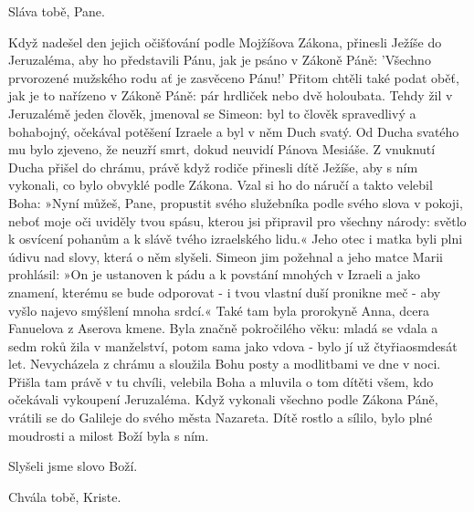 \rubricatum{\Rbardot{}} Sláva tobě, Pane.

Když nadešel den jejich očišťování podle Mojžíšova Zákona, přinesli Ježíše
do Jeruzaléma, aby ho představili Pánu, jak je psáno v Zákoně Páně: 'Všechno
prvorozené mužského rodu ať je zasvěceno Pánu!' Přitom chtěli také podat
oběť, jak je to nařízeno v Zákoně Páně: pár hrdliček nebo dvě holoubata. 
Tehdy žil v Jeruzalémě jeden člověk, jmenoval se Simeon: byl to člověk
spravedlivý a bohabojný, očekával potěšení Izraele a byl v něm Duch svatý. 
Od Ducha svatého mu bylo zjeveno, že neuzří smrt, dokud neuvidí Pánova
Mesiáše.  Z vnuknutí Ducha přišel do chrámu, právě když rodiče přinesli dítě
Ježíše, aby s ním vykonali, co bylo obvyklé podle Zákona.  Vzal si ho do
náručí a takto velebil Boha: »Nyní můžeš, Pane, propustit svého služebníka
podle svého slova v pokoji, neboť moje oči uviděly tvou spásu, kterou jsi
připravil pro všechny národy: světlo k osvícení pohanům a k slávě tvého
izraelského lidu.« Jeho otec i matka byli plni údivu nad slovy, která o něm
slyšeli.  Simeon jim požehnal a jeho matce Marii prohlásil: »On je ustanoven
k pádu a k povstání mnohých v Izraeli a jako znamení, kterému se bude
odporovat - i tvou vlastní duší pronikne meč - aby vyšlo najevo smýšlení
mnoha srdcí.« Také tam byla prorokyně Anna, dcera Fanuelova z Aserova kmene. 
Byla značně pokročilého věku: mladá se vdala a sedm roků žila v manželství,
potom sama jako vdova - bylo jí už čtyřiaosmdesát let.  Nevycházela z chrámu
a sloužila Bohu posty a modlitbami ve dne v noci.  Přišla tam právě v tu
chvíli, velebila Boha a mluvila o tom dítěti všem, kdo očekávali vykoupení
Jeruzaléma.  Když vykonali všechno podle Zákona Páně, vrátili se do Galileje
do svého města Nazareta.  Dítě rostlo a sílilo, bylo plné moudrosti a milost
Boží byla s ním.

Slyšeli jsme slovo Boží.

\rubricatum{\Rbardot{}} Chvála tobě, Kriste.
